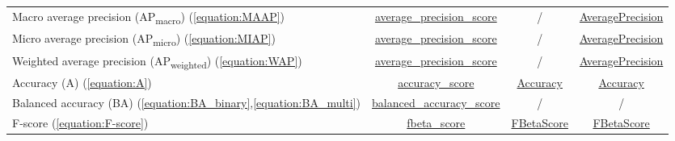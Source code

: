 \documentclass{article}
\begin{document}
\begin{table}[H]
{\begin{tabular}{|l|c|c|c|}
        Macro average precision (AP\textsubscript{macro}) (\ref{equation:MAAP})
        &
        \href{https://scikit-learn.org/stable/modules/generated/sklearn.metrics.average_precision_score.html\#sklearn.metrics.average_precision_score}{average\_precision\_score}
        &
        /
        &
        \href{https://torchmetrics.readthedocs.io/en/latest/classification/average_precision.html}{AveragePrecision}
        \\

        Micro average precision (AP\textsubscript{micro}) (\ref{equation:MIAP})
        &
        \href{https://scikit-learn.org/stable/modules/generated/sklearn.metrics.average_precision_score.html\#sklearn.metrics.average_precision_score}{average\_precision\_score}
        &
        /
        &
        \href{https://torchmetrics.readthedocs.io/en/latest/classification/average_precision.html}{AveragePrecision}
        \\

        Weighted average precision (AP\textsubscript{weighted}) (\ref{equation:WAP})
        &
        \href{https://scikit-learn.org/stable/modules/generated/sklearn.metrics.average_precision_score.html\#sklearn.metrics.average_precision_score}{average\_precision\_score}
        &
        /
        &
        \href{https://torchmetrics.readthedocs.io/en/latest/classification/average_precision.html}{AveragePrecision}
        \\

        Accuracy (A) (\ref{equation:A})
        &
        \href{https://scikit-learn.org/stable/modules/generated/sklearn.metrics.accuracy_score.html\#sklearn.metrics.accuracy_score}{accuracy\_score}
        &
        \href{https://www.tensorflow.org/api_docs/python/tf/keras/metrics/Accuracy}{Accuracy}
        &
        \href{https://torchmetrics.readthedocs.io/en/latest/classification/accuracy.html}{Accuracy}
        \\

        Balanced accuracy (BA) (\ref{equation:BA_binary},\ref{equation:BA_multi})
        &
        \href{https://scikit-learn.org/stable/modules/generated/sklearn.metrics.balanced_accuracy_score.html\#sklearn.metrics.balanced_accuracy_score}{balanced\_accuracy\_score}
        &
        /
        &
        /
        \\

        F-score (\ref{equation:F-score})
        &
        \href{https://scikit-learn.org/stable/modules/generated/sklearn.metrics.fbeta_score.html\#sklearn.metrics.fbeta_score}{fbeta\_score}
        &
        \href{https://www.tensorflow.org/api_docs/python/tf/keras/metrics/FBetaScore}{FBetaScore}
        &
        \href{https://torchmetrics.readthedocs.io/en/latest/classification/fbeta_score.html}{FBetaScore}
        \\


\end{tabular}}
\end{table}
\end{document}
